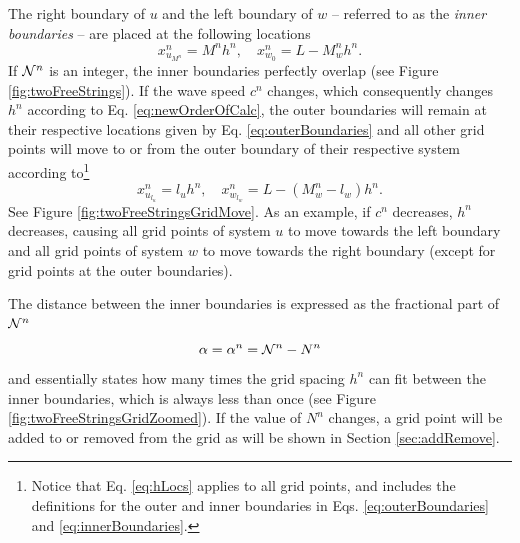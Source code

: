 The right boundary of $u$ and the left boundary of $w$ -- referred to as the \textit{inner boundaries} -- are placed at the following locations 
\begin{equation}\label{eq:innerBoundaries}
    x_{u_{M^n}}^n = M^nh^n, \quad x_{w_{0}}^n = L-M_w^nh^n.
\end{equation}
If $\mathcal{N}^n$ is an integer, the inner boundaries perfectly overlap (see Figure \ref{fig:twoFreeStrings}). If the wave speed $c^n$ changes, which consequently changes $h^n$ according to Eq. \eqref{eq:newOrderOfCalc}, the outer boundaries will remain at their respective locations given by Eq. \eqref{eq:outerBoundaries} and all other grid points will move to or from the outer boundary of their respective system according to\footnote{Notice that Eq. \eqref{eq:hLocs} applies to all grid points, and includes the definitions for the outer and inner boundaries in Eqs. \eqref{eq:outerBoundaries} and \eqref{eq:innerBoundaries}.} 
\begin{equation}\label{eq:hLocs}
    x_{u_{l_u}}^n =l_uh^n, \quad x_{w_{l_w}}^n = L-(M_w^n-l_w)h^n.
\end{equation}
See Figure \ref{fig:twoFreeStringsGridMove}. As an example, if $c^n$ decreases, $h^n$ decreases, causing all grid points of system $u$ to move towards the left boundary and all grid points of system $w$ to move towards the right boundary (except for grid points at the outer boundaries).

The distance between the inner boundaries is expressed as the fractional part of $\mathcal{N}^n$
\begin{equation}\label{eq:alphaDef}
    \alpha = \alpha^n = \mathcal{N}^n - N^n
\end{equation}
and essentially states how many times the grid spacing $h^n$ can fit between the inner boundaries, which is always less than once (see Figure \ref{fig:twoFreeStringsGridZoomed}). If the value of $N^n$ changes, a grid point will be added to or removed from the grid as will be shown in Section \ref{sec:addRemove}.

